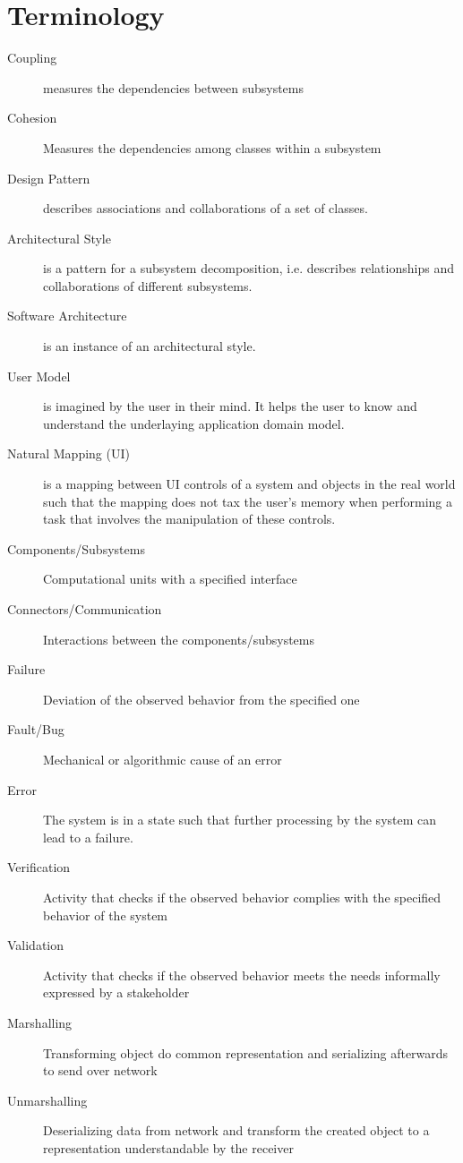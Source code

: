 
\section{Terminology}
\begin{description}
  \item[Coupling] measures the dependencies between subsystems

  \item[Cohesion] Measures the dependencies among classes within a subsystem

  \item[Design Pattern] describes associations and collaborations of a set of classes.

  \item[Architectural Style] is a pattern for a subsystem decomposition, i.e. describes relationships and collaborations of different subsystems.

  \item[Software Architecture] is an instance of an architectural style.

  \item[User Model] is imagined by the user in their mind.
  It helps the user to know and understand the underlaying application domain model.

  \item[Natural Mapping (UI)] is a mapping between UI controls of a system and objects in the real world such that the mapping does not tax the user's memory when performing a task that involves the manipulation of these controls.

  \item[Components/Subsystems] Computational units with a specified interface

  \item[Connectors/Communication] Interactions between the components/subsystems

  \item[Failure] Deviation of the observed behavior from the specified one

  \item[Fault/Bug] Mechanical or algorithmic cause of an error

  \item[Error] The system is in a state such that further processing by the system can lead to a failure.

  \item[Verification] Activity that checks if the observed behavior complies with the specified behavior of the system

  \item[Validation] Activity that checks if the observed behavior meets the needs informally expressed by a stakeholder
  
  \item[Marshalling] Transforming object do common representation and serializing afterwards to send over network
  
  \item[Unmarshalling] Deserializing data from network and transform the created object to a representation understandable by the receiver
  
\end{description}
